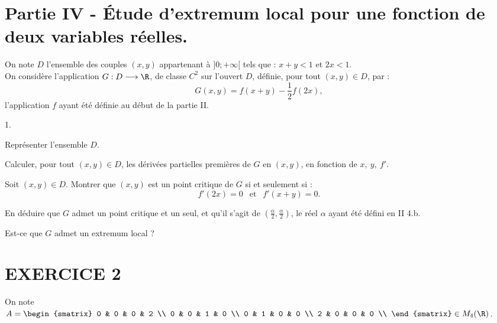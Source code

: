 \documentclass[11pt]{article}%
\begin{document}
\section*{Partie IV - Étude d'extremum local pour une fonction de deux
variables réelles.}
\noindent On note $D$ l'ensemble des couples $(x,y)$ appartenant à $] 0
; + \infty[$ tels que : $x + y < 1$ et $2 x < 1$. \\
On considère l'application $G : D \longrightarrow \R$, de classe
$C^{2}$ sur l'ouvert $D$, définie, pour tout $(x,y) \in D$, par : 
\[
G(x,y) = f(x + y) - \frac{1}{2} f(2x), 
\]
l'application $f$ ayant été définie au début de la partie II.

\begin{noliste}{1.}
 \setlength{\itemsep}{4mm}

\item Représenter l'ensemble $D$. \\

\item Calculer, pour tout $(x,y) \in D$, les dérivées partielles
premières de $G$ en $(x,y)$, en fonction de $x, \ y, \ f'$. \\

\item Soit $(x,y) \in D$. Montrer que $(x,y)$ est un point critique de
$G$ si et seulement si : 
\[
f'(2x) = 0 \ \ \text{ et } \ \ f'(x + y) = 0.
\]

\item En déduire que $G$ admet un point critique et un seul, et qu'il
s'agit de $\left( \frac{\alpha}{2}, \frac{\alpha}{2} \right)$, le réel
$\alpha$ ayant été défini en II 4.b. \\

\item Est-ce que $G$ admet un extremum local ?

\end{noliste}

\section*{EXERCICE 2}
\noindent On note $A = \begin{smatrix}
0 & 0 & 0 & 2 \\
0 & 0 & 1 & 0 \\
0 & 1 & 0 & 0 \\
2 & 0 & 0 & 0 \\
\end{smatrix}
\in M_{4} (\R)$. \\
\end{document}
